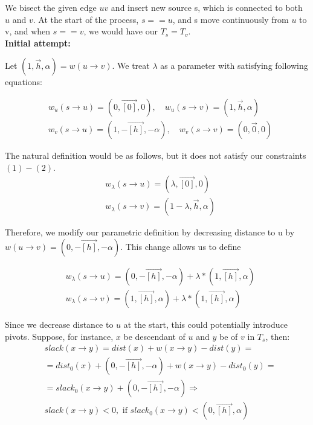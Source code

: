 \documentclass{article}
\begin{document}
We bisect the given edge $uv$ and insert new source s, which is connected to
both $u$ and $v$. At the start of the process, $s == u$, and s move continuously from $u$ to
v, and when $s == v$, we would have our $T_s = T_v$. \\

\textbf{Initial attempt:}

Let $(1, \vec{h}, \alpha) = w(u \rightarrow v)$. We treat $\lambda$ as a
parameter with satisfying following equations:

\begin{align}
&w_{u}(s \rightarrow u) = (0, \vec{[0]}, 0), \quad
  w_{u}(s \rightarrow v) = (1, \vec{h}, \alpha) \\
&w_{v}(s \rightarrow u) = (1, -\vec{[h]}, -\alpha), \quad
  w_{v}(s \rightarrow v) = (0, \vec{0}, 0)
\end{align}

The natural definition would be as follows, but it does not satisfy our
constraints $(1)-(2)$.
\begin{align}
&w_{\lambda}(s \rightarrow u) = (\lambda, \vec{[0]}, 0)  \\
&w_{\lambda}(s \rightarrow v) = (1 - \lambda, \vec{h}, \alpha)
\end{align}

Therefore, we modify our parametric definition by decreasing distance to u by
$w(u \rightarrow v) = (0, -\vec{[h]}, -\alpha)$. This change allows us to define

\begin{align}
&w_{\lambda}(s \rightarrow u) = (0, -\vec{[h]}, -\alpha) + 
\lambda * (1, \vec{[h]}, \alpha)  \\
&w_{\lambda}(s \rightarrow v) = (1, \vec{[h]}, \alpha) + 
\lambda * (1, \vec{[h]}, \alpha)
\end{align}

Since we decrease distance to $u$ at the start, this could potentially introduce
pivots. Suppose, for instance, $x$ be descendant of $u$ and $y$ be of $v$ in $T_s$,
then:
\begin{align*}
& slack(x \rightarrow y) = dist(x) + w(x \rightarrow y) - dist(y) = \\
& = dist_0(x) + (0, -\vec{[h]}, -\alpha) + w(x \rightarrow y) - dist_0(y) = \\
& = slack_0(x \rightarrow y) + (0, -\vec{[h]}, -\alpha) \Rightarrow \\
& slack(x \rightarrow y) < 0, \text{ if } slack_0(x \rightarrow y) < 
(0,\vec{[h]},\alpha)
\end{align*}
\end{document}
